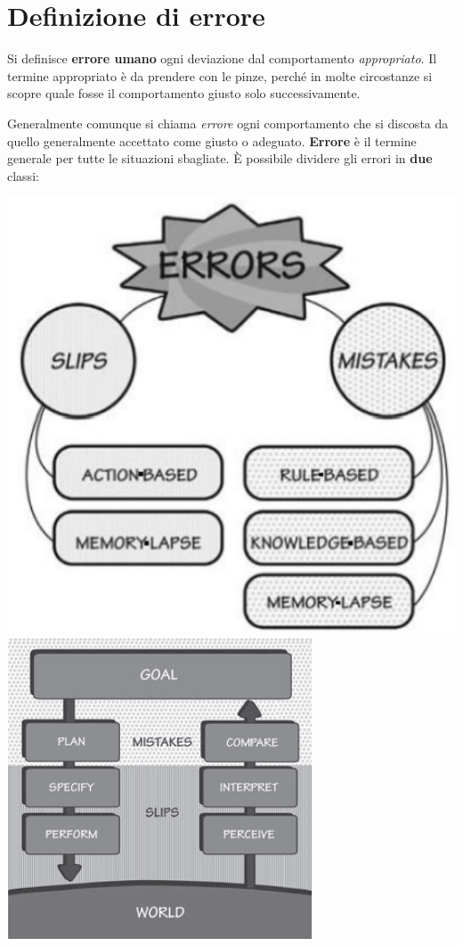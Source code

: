 \section{Definizione di errore}
Si definisce \textbf{errore umano} ogni deviazione dal comportamento \textit{appropriato}. Il termine appropriato è da prendere con le pinze, perché in molte circostanze si scopre quale fosse il comportamento giusto solo successivamente.

Generalmente comunque si chiama \textit{errore} ogni comportamento che si discosta da quello generalmente accettato come giusto o adeguato. \textbf{Errore} è il termine generale per tutte le situazioni sbagliate. È possibile dividere gli errori in \textbf{due} classi:

\begin{multicols}{2}
	\centering
	\includegraphics[scale=0.25]{../immagini/Errors.png}
	\includegraphics[scale=0.4]{../immagini/Errors1.png}
\end{multicols}

